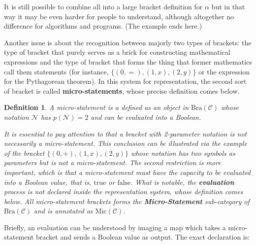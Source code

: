 \documentclass{aims}
\newtheorem{definition}{Definition}	%
\numberwithin{theorem}{section}	%
\numberwithin{axiom}{section}	%
\numberwithin{definition}{section}	%
\begin{document}
It is still possible to combine all into a large bracket definition for \(\alpha\) but in that way it may be even harder for people to understand, although altogether no difference for algorithms and programs. (The example ends here.)

Another issue is about the recognition between majorly two types of brackets: the type of bracket that purely serves as a brick for constructing mathematical expressions and the type of bracket that forms the thing that former mathematics call them statements (for instance, \(\{(0,=),(1,x),(2,y)\}\) or the expression for the Pythagorean theorem). In this system for representation, the second sort of bracket is called \textbf{ micro-statements}, whose precise definition comes below.

\begin{definition}
	A micro-statement is a defined as an object in \(\text{Bra}(\mathcal{C})\) whose notation \(\mathcal{N}\) has \(\mathit{p}(\mathcal{N})=2\) and can be evaluated into a Boolean.
	
	It is essential to pay attention to that a bracket with 2-parameter notation is not necessarily a micro-statement. This conclusion can be illustrated via the example of the bracket  \(\{(0,+),(1,x),(2,y)\}\) whose notation has two symbols as parameters but is not a micro-statement. The second restriction is more important, which is that a micro-statement must have the capacity to be evaluated into a Boolean value, that is, \(\text{true}\) or \(\text{false}\). What is notable, the \textbf{ evaluation} process is not declared inside the representation system, whose definition comes below. All micro-statement brackets forms the \textbf{ Micro-Statement }sub-category of \(\text{Bra}(\mathcal{C})\) and is annotated as \(\text{Mic}(\mathcal{C})\).
\end{definition}

 Briefly, an evaluation can be understood by imaging a map which takes a micro-statement bracket and sends a Boolean value as output. The exact declaration is:
\end{document}
